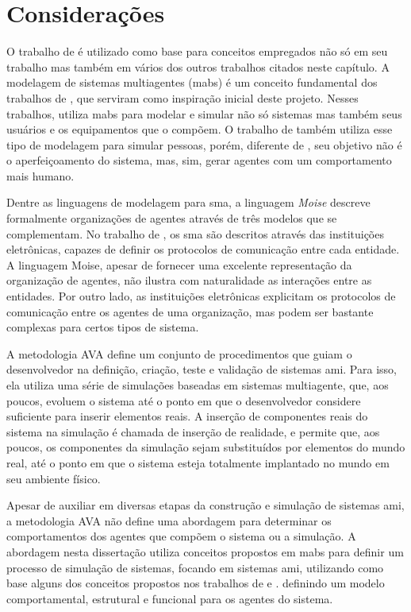 \section{Considerações}

O trabalho de  é utilizado como base para conceitos empregados não só em seu trabalho mas também em vários dos outros trabalhos citados neste capítulo. A modelagem de sistemas multiagentes (\acrshort{mabs}) é um conceito fundamental dos trabalhos de , que serviram como inspiração inicial deste projeto. Nesses trabalhos,  utiliza \acrshort{mabs} para modelar e simular não só sistemas mas também seus usuários e os equipamentos que o compõem. O trabalho de  também utiliza esse tipo de modelagem para simular pessoas, porém, diferente de , seu objetivo não é o aperfeiçoamento do sistema, mas, sim, gerar agentes com um comportamento mais humano.

Dentre as linguagens de modelagem para \acrshort{sma}, a linguagem \textit{Moise} \cite{hubner2002model, hubner2007developing} descreve formalmente organizações de agentes através de três modelos que se complementam. No trabalho de , os \acrshort{sma} são descritos através das instituições eletrônicas, capazes de definir os protocolos de comunicação entre cada entidade. A linguagem Moise, apesar de fornecer uma excelente representação da organização de agentes, não ilustra com naturalidade as interações entre as entidades. Por outro lado, as instituições eletrônicas explicitam os protocolos de comunicação entre os agentes de uma organização, mas podem ser bastante complexas para certos tipos de sistema. 

A metodologia AVA \cite{garcia2010human} define um conjunto de procedimentos que guiam o desenvolvedor na definição, criação, teste e validação de sistemas \acrshort{ami}. Para isso, ela utiliza uma série de simulações baseadas em sistemas multiagente, que, aos poucos, evoluem o sistema até o ponto em que o desenvolvedor considere suficiente para inserir elementos reais. A inserção de componentes reais do sistema na simulação é chamada de inserção de realidade, e permite que, aos poucos,  os componentes da simulação sejam substituídos por elementos do mundo real, até o ponto em que o sistema esteja totalmente implantado no mundo em seu ambiente físico.

Apesar de auxiliar em diversas etapas da construção e simulação de sistemas \acrshort{ami}, a metodologia AVA não define uma abordagem para determinar os comportamentos dos agentes que compõem o sistema ou a simulação. A abordagem nesta dissertação utiliza conceitos propostos em \acrshort{mabs} para definir um processo de simulação de sistemas, focando em sistemas \acrshort{ami}, utilizando como base alguns dos conceitos propostos nos trabalhos de  e . definindo um modelo comportamental, estrutural e funcional para os agentes do sistema. 


